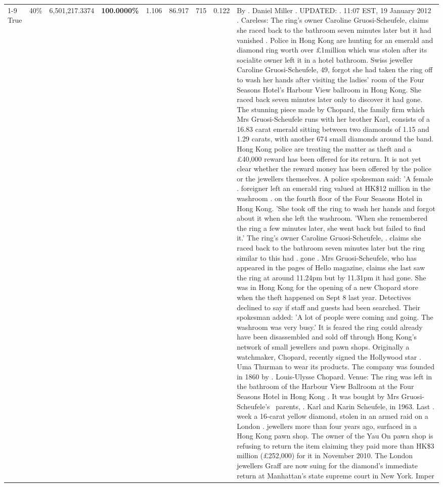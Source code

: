 \begin{table}[H]
\begin{tabular}{lllrlllll}
\cline{1-9} \cline{2-9}
True & 40\% & 6,501,217.3374 & \bfseries \color{red} 100.0000\% & 1.106 & 86.917 & 715 & 0.122 & By . Daniel Miller . UPDATED: . 11:07 EST, 19 January 2012 . Careless: The ring's owner Caroline Gruosi-Scheufele, claims she raced back to the bathroom seven minutes later but it had vanished . Police in Hong Kong are hunting for an emerald and diamond ring worth over £1million which was stolen after its socialite owner left it in a hotel bathroom. Swiss jeweller Caroline Gruosi-Scheufele, 49, forgot she had taken the ring off to wash her hands after visiting the ladies' room of the Four Seasons Hotel's Harbour View ballroom in Hong Kong. She raced back seven minutes later only to discover it had gone. The stunning piece made by Chopard, the family firm which Mrs Gruosi-Scheufele runs with her brother Karl, consists of a 16.83 carat emerald sitting between two diamonds of 1.15 and 1.29 carats, with another 674 small diamonds around the band. Hong Kong police are treating the matter as theft and a £40,000 reward has been offered for its return. It is not yet clear whether the reward money has been offered by the police or the jewellers themselves. A police spokesman said: 'A female . foreigner left an emerald ring valued at HK\$12 million in the washroom . on the fourth floor of the Four Seasons Hotel in Hong Kong. 'She took off the ring to wash her hands and forgot about it when she left the washroom. 'When she remembered the ring a few minutes later, she went back but failed to find it.' The ring's owner Caroline Gruosi-Scheufele, . claims she raced back to the bathroom seven minutes later but the ring similar to this had . gone . Mrs Gruosi-Scheufele, who has appeared in the pages of Hello magazine, claims she last saw the ring at around 11.24pm but by 11.31pm it had gone. She was in Hong Kong for the opening of a new Chopard store when the theft happened on Sept 8 last year. Detectives declined to say if staff and guests had been searched. Their spokesman added: 'A lot of people were coming and going. The washroom was very busy.' It is feared the ring could already have been disassembled and sold off through Hong Kong's network of small jewellers and pawn shops. Originally a watchmaker, Chopard, recently signed the Hollywood star . Uma Thurman to wear its products. The company was founded in 1860 by . Louis-Ulysse Chopard. Venue: The ring was left in the bathroom of the Harbour View Ballroom at the Four Seasons Hotel in Hong Kong . It was bought by Mrs Gruosi-Scheufele's  parents, . Karl and Karin Scheufele, in 1963. Last . week a 16-carat yellow diamond, stolen in an armed raid on a London . jewellers more than four years ago, surfaced in a Hong Kong pawn shop. The owner of the Yau On pawn shop is refusing to return the item claiming they paid more than HK\$3 million (£252,000) for it in November 2010. The London jewellers Graff are now suing for the diamond’s immediate return at Manhattan’s state supreme court in New York. Imper \\

\end{tabular}
\end{table}

